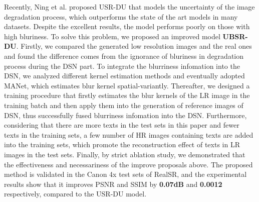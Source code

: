 Recently, Ning et al. proposed USR-DU that models the uncertainty of the image degradation process, which outperforms the state of the art models in many datasets. Despite the excellent results, the model performs poorly on those with high bluriness. To solve this problem, we proposed an improved model \textbf{UBSR-DU}. Firstly, we compared the generated low resolution images and the real ones and found the difference comes from the ignorance of bluriness in degradation process during the DSN part. To integrate the blurriness infomation into the DSN, we analyzed different kernel estimation methods and eventually adopted MANet, which estimates blur kernel spatial-variantly. Thereafter, we designed a training procedure that firstly estimates the blur kernels of the LR image in the training batch and then apply them into the generation of reference images of DSN, thus successfully fused blurriness infomation into the DSN. Furthermore, considering that there are more texts in the test sets in this paper and fewer texts in the training sets, a few number of HR images containing texts are added into the training sets, which promote the reconstruction effect of texts in LR images in the test sets. Finally, by strict ablation study, we demonstrated that the effectiveness and necessariness of the improve proposals above. The proposed method is validated in the Canon 4x test sets of RealSR, and the experimental results show that it improves PSNR and SSIM by \textbf{0.07dB} and \textbf{0.0012} respectively, compared to the USR-DU model.